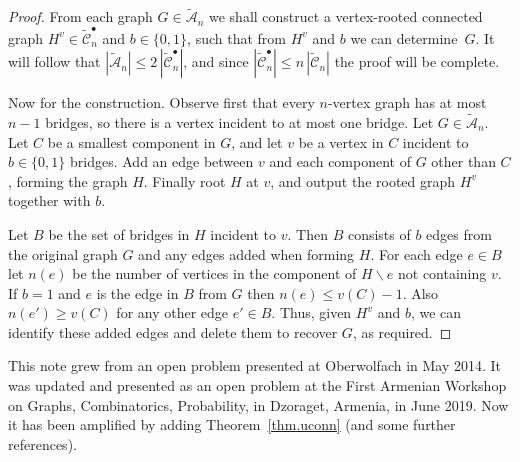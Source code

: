 \documentclass[12pt]{article}
\newcommand{\m}[1]{\marginpar{\tiny{#1}}}
\newcommand{\cA}{\mathcal A}
\newcommand{\cC}{\mathcal C}
\begin{document}
\begin{proof}
From each graph $G \in \widetilde{\cA}_n$ we shall construct a vertex-rooted connected graph $H^v \in \widetilde{\cC}^{\bullet}_n$ and $b \in \{0,1\}$, such that from $H^v$ and $b$ we can determine~$G$.
It will follow that $|\widetilde{\cA}_n | \leq 2\, |\widetilde{\cC}^{\bullet}_n |$, and since $|\widetilde{\cC}^{\bullet}_n| \leqslant n \, |\widetilde{\cC}_n|$ the proof will be complete.

Now for the construction.
Observe first that every $n$-vertex graph has at most $n-1$ bridges, so there is a vertex incident to at most one bridge.  
Let $G \in \widetilde{\cA}_n$. Let $C$ be a smallest component in $G$, and let $v$ be a vertex in $C$ incident to $b \in \{0, 1\}$ bridges.  Add an edge between $v$ and each component of $G$ other than $C$, forming the graph $H$.  Finally root $H$ at $v$, and %
output the rooted graph $H^v$ together with $b$.

Let $B$ be the set of bridges in $H$ incident to $v$. Then $B$ consists of $b$ edges from the original graph $G$ and any edges added when forming $H$.  
For each edge $e \in B$ let $n(e)$ be the number of vertices in the component of $H \backslash e$ not containing $v$. If $b=1$ and $e$ is the edge in $B$ from $G$ then $n(e) \leq v(C)-1$.  Also $n(e') \geq v(C)$ for any other edge $e' \in B$. Thus, given $H^v$ and $b$, we can identify these added edges and delete them to recover $G$, as required.
\end{proof}


\bigskip


This note grew from an open problem presented at Oberwolfach in May 2014. 
\m{Barbados?}
 It was updated and presented as an open problem at the First Armenian Workshop on Graphs, Combinatorics, Probability, in Dzoraget, Armenia, in June 2019.  Now it has been amplified by adding Theorem~\ref{thm.uconn} (and some further references).

\end{document}
